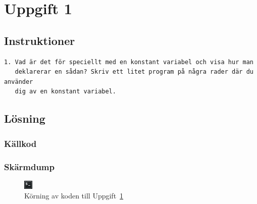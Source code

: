 \section{Uppgift 1}\label{sec:uppg01}

\subsection{Instruktioner}
\begin{verbatim}
1. Vad är det för speciellt med en konstant variabel och visa hur man
   deklarerar en sådan? Skriv ett litet program på några rader där du använder
   dig av en konstant variabel.
\end{verbatim}


\subsection{Lösning}

\subsubsection{Källkod}
\label{src:uppg01}


\subsubsection{Skärmdump}
\begin{figure}[htbp]
    \centering
        \includegraphics[width=\linewidth]{img/01.png}
    \caption{Körning av koden till Uppgift~\ref{sec:uppg01}}
\label{fig:uppg01-screenshot}
\end{figure}

